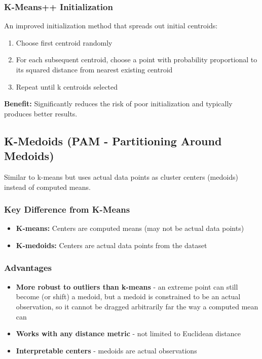 \documentclass[
]{article}
\begin{document}
\subsubsection{K-Means++ Initialization}

An improved initialization method that spreads out initial centroids:

\begin{enumerate}
\item
  Choose first centroid randomly
\item
  For each subsequent centroid, choose a point with probability
  proportional to its squared distance from nearest existing centroid
\item
  Repeat until k centroids selected
\end{enumerate}

\textbf{Benefit:} Significantly reduces the risk of poor initialization
and typically produces better results.

\textbf{ }

\subsection{K-Medoids (PAM - Partitioning Around Medoids)}

Similar to k-means but uses actual data points as cluster centers
(medoids) instead of computed means.

\subsubsection{Key Difference from K-Means}

\begin{itemize}
\item
  \textbf{K-means:} Centers are computed means (may not be actual data
  points)
\item
  \textbf{K-medoids:} Centers are actual data points from the dataset
\end{itemize}

\subsubsection{Advantages}

\begin{itemize}
\item
  \textbf{More robust to outliers than k-means} - an extreme point can
  still become (or shift) a medoid, but a medoid is constrained to be an
  actual observation, so it cannot be dragged arbitrarily far the way a
  computed mean can
\item
  \textbf{Works with any distance metric} - not limited to Euclidean
  distance
\item
  \textbf{Interpretable centers} - medoids are actual observations
\end{itemize}
\end{document}
